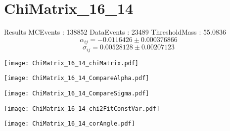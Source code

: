 \documentclass[a4paper,12pt]{article}
\begin{document}
\section{ChiMatrix\_16\_14}
\begin{minipage}{0.49\linewidth} Results \newline
MCEvents : 138852\newline
DataEvents : 23489 \newline
ThresholdMass : 55.0836\\
$$\alpha_{ij} = -0.0116426\pm 0.000376866$$
$$\sigma_{ij} = 0.00528128\pm 0.00207123$$
\end{minipage}\hfill
\begin{minipage}{0.49\linewidth} 
\texttt{[image: ChiMatrix\_16\_14\_chiMatrix.pdf]}\\
\end{minipage}
\hfill
\begin{minipage}{0.49\linewidth} 
\texttt{[image: ChiMatrix\_16\_14\_CompareAlpha.pdf]}\\
\end{minipage}
\hfill
\begin{minipage}{0.49\linewidth} 
\texttt{[image: ChiMatrix\_16\_14\_CompareSigma.pdf]}\\
\end{minipage}
\begin{minipage}{0.49\linewidth} 
\texttt{[image: ChiMatrix\_16\_14\_chi2FitConstVar.pdf]}\\
\end{minipage}
\hfill
\begin{minipage}{0.49\linewidth} 
\texttt{[image: ChiMatrix\_16\_14\_corAngle.pdf]}\\
\end{minipage}
\end{document}
